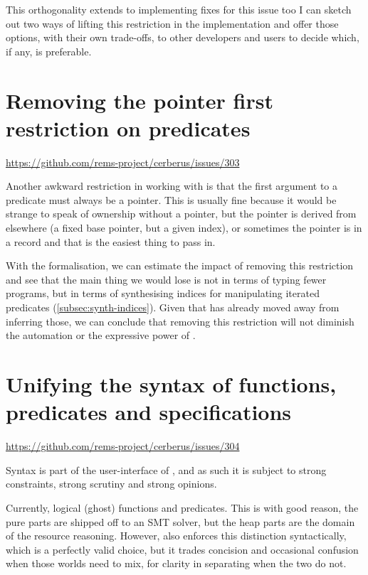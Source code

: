 This orthogonality extends to implementing fixes for this issue too
\textemdash{} I can sketch out two ways of lifting this restriction in the
implementation and offer those options, with their own trade-offs, to other
developers and users to decide which, if any, is preferable.

\section{Removing the pointer first restriction on predicates}\label{sec:rm-ptr-first}
\url{https://github.com/rems-project/cerberus/issues/303}

Another awkward restriction in working with  is that the first argument
to a predicate must always be a pointer. This is usually fine because it would
be strange to speak of ownership without a pointer, but the pointer is derived
from elsewhere (a fixed base pointer, but a given index), or sometimes the
pointer is in a record and that is the easiest thing to pass in.

With the formalisation, we can estimate the impact of removing this restriction
and see that the main thing we would lose is not in terms of typing fewer
programs, but in terms of synthesising indices for manipulating iterated
predicates (\cref{subsec:synth-indices}). Given that  has already moved
away from inferring those, we can
conclude that removing this restriction will not diminish the automation or the
expressive power of .

\section{Unifying the syntax of functions, predicates and specifications}

\url{https://github.com/rems-project/cerberus/issues/304}

Syntax is part of the user-interface of , and as such it is subject to
strong constraints, strong scrutiny and strong opinions.

Currently, logical (ghost) functions and predicates. This is with good reason,
the pure parts are shipped off to an SMT solver, but the heap parts are the
domain of the resource reasoning. However,  also enforces this
distinction syntactically, which is a perfectly valid choice, but it trades
concision and occasional confusion when those worlds need to mix, for clarity
in separating when the two do not.

